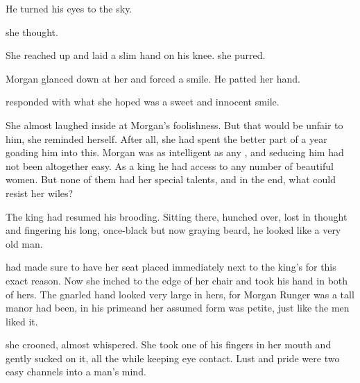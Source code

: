 He turned his eyes to the sky.

 she thought. 

She reached up and laid a slim hand on his knee.
 she purred. 

Morgan glanced down at her and forced a smile. 
He patted her hand. 

\Takestsha{} responded with what she hoped was a sweet and innocent smile. 

She almost laughed inside at Morgan's foolishness. 
But that would be unfair to him, she reminded herself. 
After all, she had spent the better part of a year goading him into this. 
Morgan was as intelligent as any \human, and seducing him had not been altogether easy. 
As a king he had access to any number of beautiful women. 
But none of them had her special talents, and in the end, what \human{} could resist her wiles?

The king had resumed his brooding. 
Sitting there, hunched over, lost in thought and fingering his long, once-black but now graying beard, he looked like a very old man. 


\Takestsha{} had made sure to have her seat placed immediately next to the king's for this exact reason. 
Now she inched to the edge of her chair and took his hand in both of hers. 
The gnarled hand looked very large in hers, for Morgan Runger was a tall man\dash or had been, in his prime\dash and her assumed form was petite, just like the men liked it. 

 she crooned, almost whispered. 
She took one of his fingers in her mouth and gently sucked on it, all the while keeping eye contact. 
Lust and pride were two easy channels into a man's mind. 

